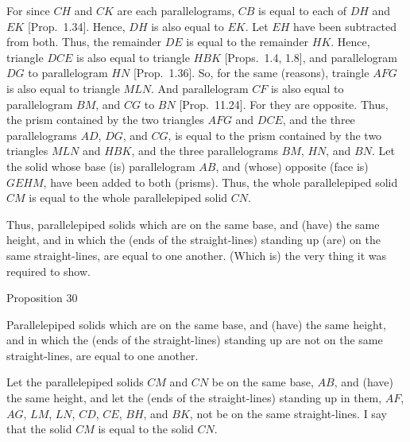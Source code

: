 For since $CH$ and $CK$ are each parallelograms, $CB$ is equal to each 
of $DH$ and $EK$ [Prop.~1.34]. Hence,
$DH$ is also equal to $EK$. Let $EH$ have been subtracted from both.
Thus, the remainder $DE$ is equal to the remainder $HK$.
Hence, triangle $DCE$ is also equal to triangle $HBK$ [Props.~1.4, 1.8], and parallelogram $DG$ to parallelogram $HN$
[Prop.~1.36]. So, for the same (reasons), traingle
$AFG$ is also equal to triangle $MLN$. And parallelogram $CF$ is
also equal to parallelogram $BM$, and $CG$ to $BN$ [Prop.~11.24]. For they are opposite. Thus, the prism contained by the
two triangles $AFG$ and $DCE$, and the three parallelograms $AD$,
$DG$, and $CG$, is equal to the prism contained by the two triangles
$MLN$ and $HBK$, and the three parallelograms $BM$, $HN$, and
$BN$. Let the solid whose base (is) parallelogram $AB$, and
(whose) opposite (face is) $GEHM$, have been added to both (prisms).
Thus, the whole parallelepiped solid $CM$ is equal to the whole parallelepiped solid $CN$.

Thus, parallelepiped solids which are on the same base,
and (have) the same height, and in which the (ends of the straight-lines) standing up (are) on the same straight-lines, 
are equal to one another. (Which is) the very thing it was required to show.


\begin{center}
{\large Proposition 30}
\end{center}

Parallelepiped solids which are on the same base,
and (have) the same height, and in which the (ends of the straight-lines)
standing up are not on the same straight-lines, are equal to one another.

\epsfysize=2.2in
\centerline{}

Let the parallelepiped solids $CM$ and $CN$ be on the same base, $AB$,
and (have) the same height, and let the (ends of the straight-lines)
standing up in them, $AF$, $AG$, $LM$, $LN$, $CD$, $CE$, $BH$,
and $BK$, not be on the same straight-lines. I say that the solid $CM$
is equal to the solid $CN$.

